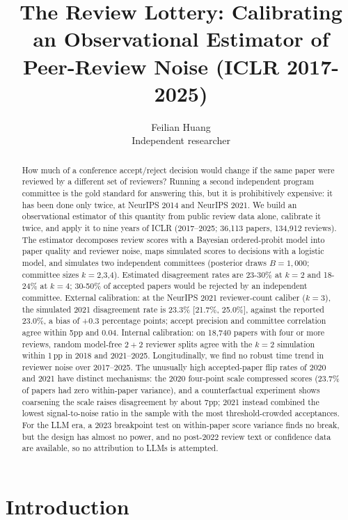 \documentclass[10pt]{article}
\title{The Review Lottery: Calibrating an Observational Estimator of Peer-Review Noise (ICLR 2017-2025)}
\author{\name Feilian Huang \\ \addr Independent researcher}
\begin{document}
\maketitle

\begin{abstract}
How much of a conference accept/reject decision would change if the same paper were reviewed by a different set of reviewers? Running a second independent program committee is the gold standard for answering this, but it is prohibitively expensive: it has been done only twice, at NeurIPS 2014 and NeurIPS 2021. We build an observational estimator of this quantity from public review data alone, calibrate it twice, and apply it to nine years of ICLR (2017--2025; 36,113 papers, 134,912 reviews). The estimator decomposes review scores with a Bayesian ordered-probit model into paper quality and reviewer noise, maps simulated scores to decisions with a logistic model, and simulates two independent committees (posterior draws $B=1{,}000$; committee sizes $k=2$,3,4). Estimated disagreement rates are 23-30\% at $k=2$ and 18-24\% at $k=4$; 30-50\% of accepted papers would be rejected by an independent committee. External calibration: at the NeurIPS 2021 reviewer-count caliber ($k=3$), the simulated 2021 disagreement rate is 23.3\% [21.7\%, 25.0\%], against the reported 23.0\%, a bias of +0.3 percentage points; accept precision and committee correlation agree within 5pp and 0.04. Internal calibration: on 18,740 papers with four or more reviews, random model-free $2{+}2$ reviewer splits agree with the $k=2$ simulation within 1\,pp in 2018 and 2021--2025. Longitudinally, we find no robust time trend in reviewer noise over 2017--2025. The unusually high accepted-paper flip rates of 2020 and 2021 have distinct mechanisms: the 2020 four-point scale compressed scores (23.7\% of papers had zero within-paper variance), and a counterfactual experiment shows coarsening the scale raises disagreement by about 7pp; 2021 instead combined the lowest signal-to-noise ratio in the sample with the most threshold-crowded acceptances. For the LLM era, a 2023 breakpoint test on within-paper score variance finds no break, but the design has almost no power, and no post-2022 review text or confidence data are available, so no attribution to LLMs is attempted.
\end{abstract}

\section{Introduction}
\end{document}
